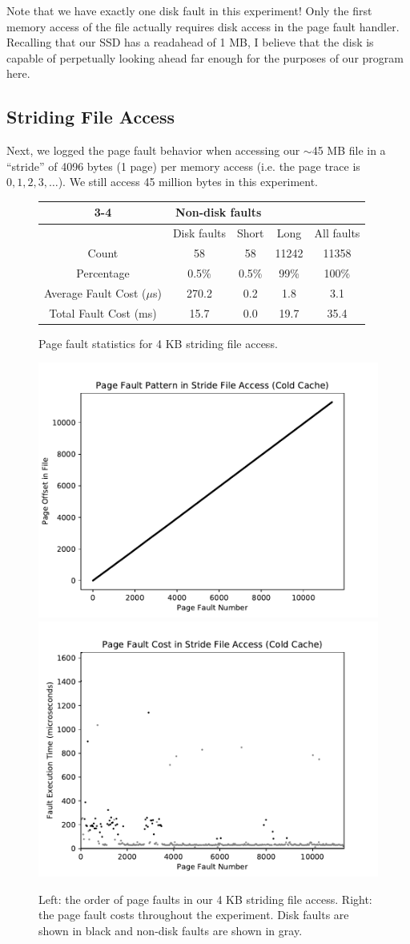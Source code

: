 \documentclass{article}
\begin{document}
	Note that we have exactly one disk fault in this experiment! Only the first memory access of the file actually requires disk access in the page fault handler.\\
	
	Recalling that our SSD has a readahead of 1 MB, I believe that the disk is capable of perpetually looking ahead far enough for the purposes of our program here.

\subsection{Striding File Access}

	Next, we logged the page fault behavior when accessing our $\sim$45 MB file in a ``stride'' of 4096 bytes (1 page) per memory access (i.e. the page trace is $0, 1, 2, 3, \dots$). We still access 45 million bytes in this experiment.
	
	\begin{figure}[ht!]
		\centering
		\begin{tabular}{|c|c|c|c|c|}
			\cline{3-4}\multicolumn{2}{}{}&\multicolumn{2}{|c|}{Non-disk faults}\\
			\hline & Disk faults & Short & Long & All faults\\\hline
			Count & 58 & 58 & 11242 & 11358\\
			Percentage & 0.5\% & 0.5\% & 99\% & 100\% \\
			Average Fault Cost ($\mu$s) & 270.2 & 0.2 & 1.8 & 3.1 \\
			Total Fault Cost (ms) & 15.7 & 0.0 & 19.7 & 35.4 \\\hline
		\end{tabular}
		\caption{Page fault statistics for 4 KB striding file access.}
	\end{figure}
	\begin{figure}[ht!]
		\centering
		\includegraphics[width=0.45\linewidth, trim=0.4cm 0.4cm 0.4cm 0.4cm]{figures/stride1.pdf}
		\includegraphics[width=0.45\linewidth, trim=0.4cm 0.4cm 0.4cm 0.4cm]{figures/stride2.pdf}
		\caption{Left: the order of page faults in our 4 KB striding file access. Right: the page fault costs throughout the experiment. Disk faults are shown in black and non-disk faults are shown in gray.}
	\end{figure}
	
\end{document}
